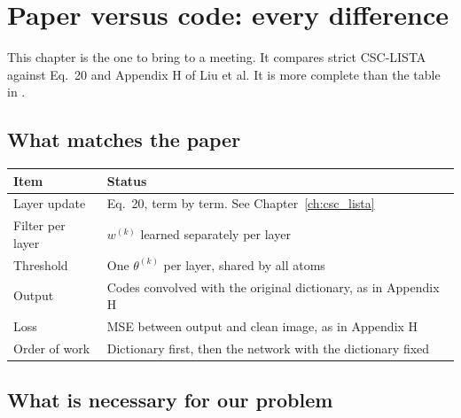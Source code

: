\chapter{Paper versus code: every difference}\label{ch:differences}

This chapter is the one to bring to a meeting. It compares strict CSC-LISTA against Eq.~20 and Appendix H
of Liu et al. It is more complete than the table in .

\section{What matches the paper}

\begin{center}
\renewcommand{\arraystretch}{1.3}
\begin{tabularx}{\textwidth}{lX}
\toprule
Item & Status \\
\midrule
Layer update & Eq.~20, term by term. See Chapter~\ref{ch:csc_lista} \\
Filter per layer & $w^{(k)}$ learned separately per layer \\
Threshold & One $\theta^{(k)}$ per layer, shared by all atoms \\
Output & Codes convolved with the original dictionary, as in Appendix H \\
Loss & MSE between output and clean image, as in Appendix H \\
Order of work & Dictionary first, then the network with the dictionary fixed \\
\bottomrule
\end{tabularx}
\end{center}

\section{What is necessary for our problem}

